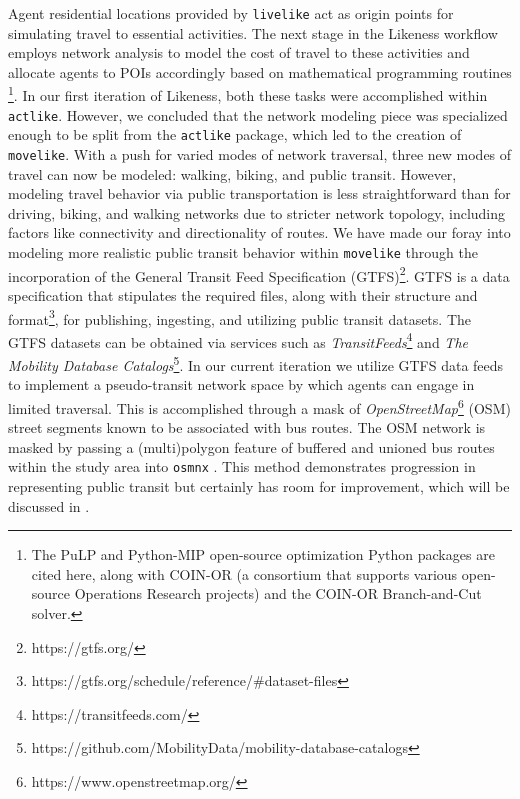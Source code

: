 

Agent residential locations provided by \texttt{livelike} act as origin points for simulating travel to essential activities.
The next stage in the Likeness workflow employs network analysis to model the cost of travel to these activities \cite{OpenStreetMap, osmnx_CEUS_2017, foti_generalized_2012} and allocate agents to POIs accordingly based on mathematical programming routines \cite{mitchell_pulp_2011, santos_mixed_2020, lougee_coin_2003, forrest_coinorcbc_2023}\footnote{The PuLP and Python-MIP open-source optimization Python packages are cited here, along with COIN-OR (a consortium that supports various open-source Operations Research projects) and the COIN-OR Branch-and-Cut solver.}. In our first iteration of Likeness, both these tasks were accomplished within \texttt{actlike}. However, we concluded that the network modeling piece was specialized enough to be split from the \texttt{actlike} package, which led to the creation of \texttt{movelike}. With a push for varied modes of network traversal, three new modes of travel can now be modeled: walking, biking, and public transit. However, modeling travel behavior via public transportation is less straightforward than for driving, biking, and walking networks due to stricter network topology, including factors like connectivity and directionality of routes. We have made our foray into modeling more realistic public transit behavior within \texttt{movelike} through the incorporation of the General Transit Feed Specification (GTFS)\footnote{https://gtfs.org/}. GTFS is a data specification that stipulates the required files, along with their structure and format\footnote{https://gtfs.org/schedule/reference/\#dataset-files}, for publishing, ingesting, and utilizing public transit datasets. The GTFS datasets can be obtained via services such as \textit{TransitFeeds}\footnote{https://transitfeeds.com/} and \textit{The Mobility Database Catalogs}\footnote{https://github.com/MobilityData/mobility-database-catalogs}. In our current iteration we utilize GTFS data feeds to implement a pseudo-transit network space by which agents can engage in limited traversal. This is accomplished through a mask of \textit{OpenStreetMap}\footnote{https://www.openstreetmap.org/} (OSM) street segments known to be associated with bus routes. The OSM network is masked by passing a (multi)polygon feature of buffered and unioned bus routes within the study area into \texttt{osmnx} \cite{osmnx_CEUS_2017}. This method demonstrates progression in representing public transit but certainly has room for improvement, which will be discussed in .

